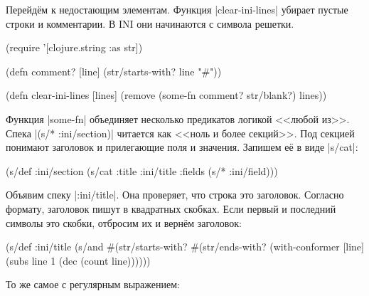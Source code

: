 
Перейд\"{е}м к недостающим элементам. Функция \spverb|clear-ini-lines| убирает
пустые строки и комментарии. В INI они начинаются с символа решетки.

\begin{english}
  \begin{clojure}
(require '[clojure.string :as str])

(defn comment? [line]
  (str/starts-with? line "#"))

(defn clear-ini-lines [lines]
  (remove (some-fn comment? str/blank?) lines))
  \end{clojure}
\end{english}


Функция \spverb|some-fn| объединяет несколько предикатов логикой <<любой
из>>. Спека \spverb|(s/* :ini/section)| читается как <<ноль и более
секций>>. Под секцией понимают заголовок и прилегающие поля и значения. Запишем
е\"{е} в виде \spverb|s/cat|:

\begin{english}
  \begin{clojure}
(s/def :ini/section
  (s/cat :title :ini/title :fields (s/* :ini/field)))
  \end{clojure}
\end{english}

Объявим спеку \spverb|:ini/title|. Она проверяет, что строка это
заголовок. Согласно формату, заголовок пишут в квадратных скобках. Если первый и
последний символы это скобки, отбросим их и верн\"{е}м заголовок:

\begin{english}
  \begin{clojure}
(s/def :ini/title
  (s/and
   #(str/starts-with? %
   #(str/ends-with? %
   (with-conformer [line]
     (subs line 1 (dec (count line))))))
  \end{clojure}
\end{english}

\noindent
То же самое с регулярным выражением:

\begin{english}
\end{english}

